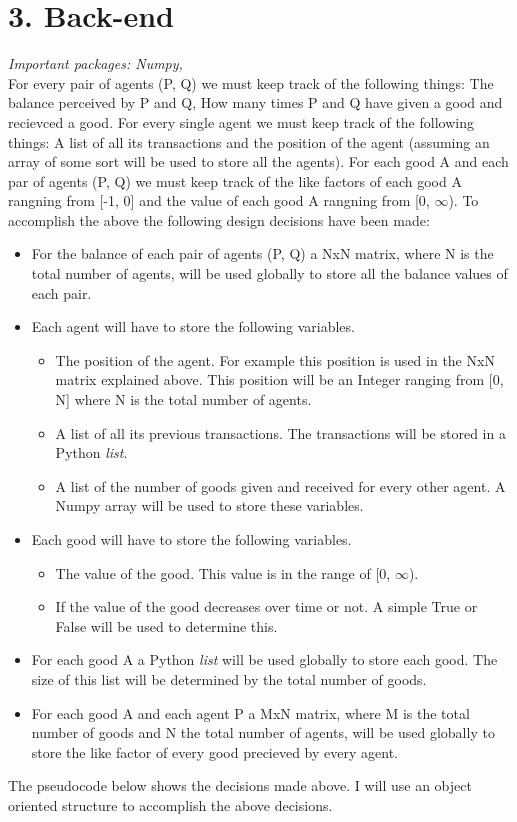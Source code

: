 \documentclass{article}
\begin{document}
\section{3. Back-end}
\textit{Important packages: Numpy, }
\\
For every pair of agents (P, Q) we must keep track of the following things: The balance perceived by P and Q, How many times P and Q have given a good and recievced a good. For every single agent we must keep track of the following things: A list of all its transactions and the position of the agent (assuming an array of some sort will be used to store all the agents). For each good A and each par of agents (P, Q) we must keep track of the like factors  of each good A rangning from [-1, 0] and the value of each good A rangning from [0, $\infty$).
To accomplish the above the following design decisions have been made:
\begin{itemize}
  \item For the balance of each pair of agents (P, Q) a NxN matrix, where N is the total number of agents, will be used globally to store all the balance values of each pair.
  \item Each agent will have to store the following variables.
	\begin{itemize}
  		\item The position of the agent. For example this position is used in the NxN matrix explained above. This position will be an Integer ranging from [0, N] where N is the total number of agents.
  		\item A list of all its previous transactions. The transactions will be stored in a Python \textit{list}.
  		\item A list of the number of goods given and received for every other agent. A Numpy array will be used to store these variables.
	\end{itemize}
  \item Each good will have to store the following variables.
	\begin{itemize}
  		\item The value of the good. This value is in the range of [0, $\infty$).
  		\item If the value of the good decreases over time or not. A simple True or False will be used to determine this.
	\end{itemize}
  \item For each good A a Python \textit{list} will be used globally to store each good. The size of this list will be determined by the total number of goods.
  \item For each good A and each agent P a MxN matrix, where M is the total number of goods and N the total number of agents, will be used globally to store the like factor of every good precieved by every agent.
\end{itemize}
The pseudocode below shows the decisions made above. I will use an object oriented structure to accomplish the above decisions.
\end{document}

